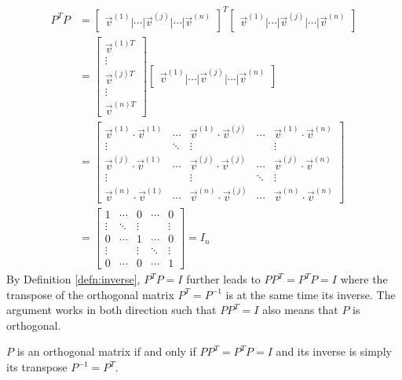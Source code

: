 \begin{align*}
P^TP &= 
\begin{bmatrix}
\vec{v}^{(1)}|\cdots|\vec{v}^{(j)}|\cdots|\vec{v}^{(n)}   
\end{bmatrix}^T
\begin{bmatrix}
\vec{v}^{(1)}|\cdots|\vec{v}^{(j)}|\cdots|\vec{v}^{(n)}   
\end{bmatrix} \\
&= 
\left[
\begin{array}{c}
\vec{v}^{(1)T}\\
\hline
\vdots \\
\hline
\vec{v}^{(j)T} \\
\hline
\vdots \\
\hline
\vec{v}^{(n)T}  
\end{array}
\right]
\begin{bmatrix}
\vec{v}^{(1)}|\cdots|\vec{v}^{(j)}|\cdots|\vec{v}^{(n)}
\end{bmatrix} \\ 
&=
\begin{bmatrix}
\vec{v}^{(1)} \cdot \vec{v}^{(1)} & \cdots & \vec{v}^{(1)} \cdot \vec{v}^{(j)} & \cdots & \vec{v}^{(1)} \cdot \vec{v}^{(n)} \\
\vdots & \ddots & \vdots & & \vdots \\
\vec{v}^{(j)} \cdot \vec{v}^{(1)} & \cdots & \vec{v}^{(j)} \cdot \vec{v}^{(j)} & \cdots & \vec{v}^{(j)} \cdot \vec{v}^{(n)} \\
\vdots & & \vdots & \ddots & \vdots \\
\vec{v}^{(n)} \cdot \vec{v}^{(1)} & \cdots & \vec{v}^{(n)} \cdot \vec{v}^{(j)} & \cdots & \vec{v}^{(n)} \cdot \vec{v}^{(n)}
\end{bmatrix} \\
&=
\begin{bmatrix}
1 & \cdots & 0 & \cdots & 0 \\
\vdots & \ddots & \vdots & & \vdots \\
0 & \cdots & 1 & \cdots & 0 \\
\vdots & & \vdots & \ddots & \vdots \\
0 & \cdots & 0 & \cdots & 1
\end{bmatrix} = I_n
\end{align*}
By Definition \ref{defn:inverse}, $P^TP = I$ further leads to $PP^T = P^TP = I$ where the transpose of the orthogonal matrix $P^T = P^{-1}$ is at the same time its inverse. The argument works in both direction such that $PP^T = I$ also means that $P$ is orthogonal.
\begin{proper}
\label{proper:orthoinvT}
$P$ is an orthogonal matrix if and only if $PP^T = P^TP = I$ and its inverse is simply its transpose $P^{-1} = P^T$.
\end{proper}
